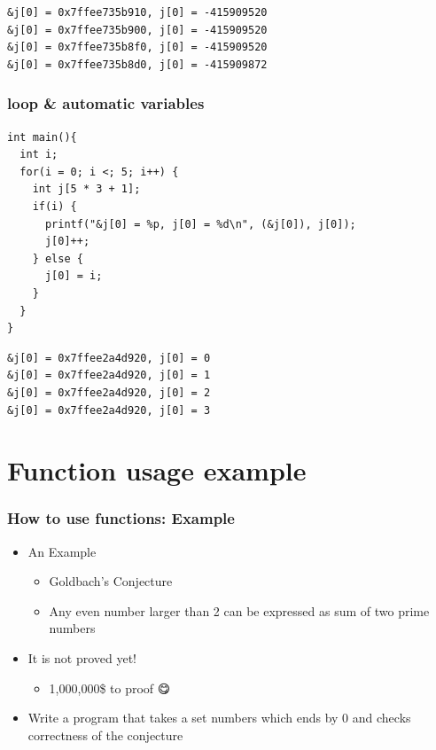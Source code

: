 \documentclass{../c-lecture}
\begin{document}
\begin{frame}[fragile]
  \begin{verbatim}
&j[0] = 0x7ffee735b910, j[0] = -415909520
&j[0] = 0x7ffee735b900, j[0] = -415909520
&j[0] = 0x7ffee735b8f0, j[0] = -415909520
&j[0] = 0x7ffee735b8d0, j[0] = -415909872
  \end{verbatim}
\end{frame}

\begin{frame}[fragile]
  \frametitle{loop \& automatic variables}
  \begin{verbatim}
int main(){
  int i;
  for(i = 0; i <; 5; i++) {
    int j[5 * 3 + 1];
    if(i) {
      printf("&j[0] = %p, j[0] = %d\n", (&j[0]), j[0]);
      j[0]++;
    } else {
      j[0] = i;
    }
  }
}
  \end{verbatim}
\end{frame}

\begin{frame}[fragile]
  \begin{verbatim}
&j[0] = 0x7ffee2a4d920, j[0] = 0
&j[0] = 0x7ffee2a4d920, j[0] = 1
&j[0] = 0x7ffee2a4d920, j[0] = 2
&j[0] = 0x7ffee2a4d920, j[0] = 3
  \end{verbatim}
\end{frame}

\section{Function usage example}

\begin{frame}
  \frametitle{How to use functions: Example}
  \begin{itemize}
    \item An Example
    \begin{itemize}
      \item Goldbach’s Conjecture
      \item
        Any even number larger than 2 can be expressed as sum of two prime
        numbers
    \end{itemize}
    \item It is not proved yet!
    \begin{itemize}
      \item 1,000,000\$ to proof 😋
    \end{itemize}
    \item
      Write a program that takes a set numbers which ends by 0 and checks
      correctness of the conjecture
  \end{itemize}
\end{frame}
\end{document}
